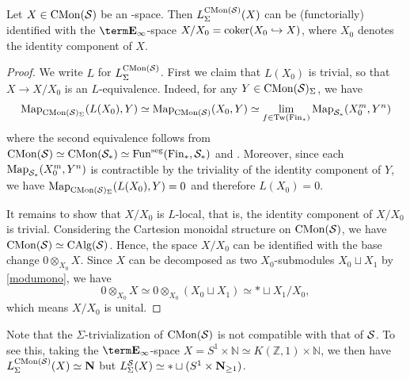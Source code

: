 \documentclass[10pt,a4paper,oneside]{article}
\begin{document}
\begin{prop}
Let $X\in \operatorname{CMon}(\mathcal{S})$ be an \ein-space. Then $L_\Sigma^{\operatorname{CMon}(\mathcal{S})}(X)$ can be (functorially) identified with the $\einf$-space $X/X_0 = \operatorname{coker}(X_0 \hookrightarrow X)$, where $X_0$ denotes the identity component of $X$.
\end{prop}

\begin{proof}
We write $L$ for $L_\Sigma^{\operatorname{CMon}(\mathcal{S})}$. First we claim that $L(X_0)$ is trivial, so that $X\to X/X_0$ is an $L$-equivalence. Indeed, for any $Y\in \operatorname{CMon}(\mathcal{S})_\Sigma$, we have $$\operatorname{Map}_{\operatorname{CMon}(\mathcal{S})_\Sigma}(L(X_0),Y)\simeq \operatorname{Map}_{\operatorname{CMon}(\mathcal{S})}(X_0,Y)\simeq \lim_{f\in \operatorname{Tw}(\operatorname{Fin}_*)} \operatorname{Map}_{\mathcal{S}_*}(X_{0}^m,Y^n)$$
where the second equivalence follows from $\operatorname{CMon}(\mathcal{S})\simeq\operatorname{CMon}(\mathcal{S}_*)\simeq \operatorname{Fun}^{\operatorname{seg}}(\operatorname{Fin}_*,\mathcal{S}_*)$ and \cite[\href{https://kerodon.net/tag/03P7}{Example~03P7}]{kerodon}. Moreover, since each $\operatorname{Map}_{\mathcal{S}_*}(X_{0}^m,Y^n)$ is contractible by the triviality of the identity component of $Y$, we have $\operatorname{Map}_{\operatorname{CMon}(\mathcal{S})_\Sigma}(L(X_0),Y)=0$ and therefore $L(X_0)=0$.

It remains to show that $X/X_0$ is $L$-local, that is, the identity component of $X/X_0$ is trivial. Considering the Cartesion monoidal structure on $\operatorname{CMon}(\mathcal{S})$, we have $\operatorname{CMon}(\mathcal{S})\simeq \operatorname{CAlg}(\mathcal{S})$. Hence, the space $X/X_0$ can be identified with the base change $0\otimes_{X_0}X$. Since $X$ can be decomposed as two $X_0$-submodules $X_0\sqcup X_1$ by \cref{modumono}, we have $$0\otimes_{X_0}X\simeq 0\otimes_{X_0}(X_0\sqcup X_1)\simeq *\sqcup X_1/X_0,$$
which means $X/X_0$ is unital.
\end{proof}

\begin{rem}
Note that the $\Sigma$-trivialization of $\operatorname{CMon}(\mathcal{S})$ is not compatible with that of $\mathcal{S}$. To see this, taking the $\einf$-space $X=S^1\times \mathbb{N}\simeq K(\mathbb{Z},1)\times\mathbb{N}$, we then have $L_\Sigma^{\operatorname{CMon}(\mathcal{S})}(X)\simeq \mathbf{N}$
but $L_\Sigma^\mathcal{S}(X)\simeq *\sqcup (S^1\times \mathbf{N}_{\geq1})$.
\end{rem}
\end{document}
